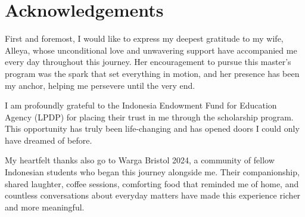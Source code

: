 \documentclass[ %
                    author={Revalda Putawara},
                supervisor={Dr. James Pope},
                    degree={MSc},
                     title={Robustness of Bayesian Neural Networks Design Choices Against Weight and Bias Perturbation Induced by Single Event Upsets (SEUs)},
                      type={},
                      year={2025}]{dissertation}
\begin{document}

\chapter*{Acknowledgements}

First and foremost, I would like to express my deepest gratitude to my wife, Alleya, whose unconditional love and unwavering support have accompanied me every day throughout this journey. Her encouragement to pursue this master's program was the spark that set everything in motion, and her presence has been my anchor, helping me persevere until the very end.

I am profoundly grateful to the Indonesia Endowment Fund for Education Agency (LPDP) for placing their trust in me through the scholarship program. This opportunity has truly been life-changing and has opened doors I could only have dreamed of before.

My heartfelt thanks also go to Warga Bristol 2024, a community of fellow Indonesian students who began this journey alongside me. Their companionship, shared laughter, coffee sessions, comforting food that reminded me of home, and countless conversations about everyday matters have made this experience richer and more meaningful.
\end{document}

